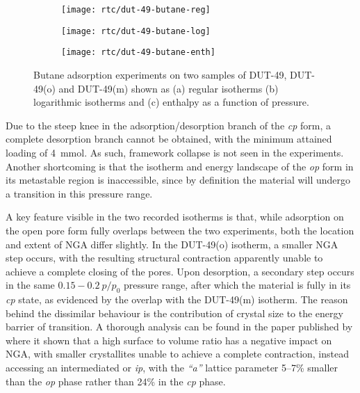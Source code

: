 \begin{figure}[htb]
    \centering
    \begin{subfigure}{0.33\linewidth}
        \texttt{[image: rtc/dut-49-butane-reg]}%
        \caption{}\label{dut:fig:dut-49-butane-reg}
    \end{subfigure}%
    \begin{subfigure}{0.33\linewidth}
        \texttt{[image: rtc/dut-49-butane-log]}%
        \caption{}\label{dut:fig:dut-49-butane-log}
    \end{subfigure}%
    \begin{subfigure}{0.33\linewidth}
        \texttt{[image: rtc/dut-49-butane-enth]}%
        \caption{}\label{dut:fig:dut-49-butane-enth}
    \end{subfigure}%
    \caption{Butane adsorption experiments on two samples of 
    DUT-49, DUT-49(o) and DUT-49(m) shown as (a) regular 
    isotherms (b) logarithmic isotherms 
    and (c) enthalpy as a function of pressure.}%
    \label{dut:fig:dut-49-butane}
\end{figure}

Due to the steep knee in the adsorption/desorption branch of the 
\textit{cp} form, a complete desorption branch cannot be obtained,
with the minimum attained loading of \SI{4}{\milli\mol}. As such,
framework collapse is not seen in the experiments. Another 
shortcoming is that the isotherm
and energy landscape of the \textit{op} form in its metastable 
region is inaccessible, since by definition the material will 
undergo a transition in this pressure range.

A key feature visible in the two recorded isotherms is that,
while adsorption on the open pore form fully overlaps between the 
two experiments, both the location and extent of \gls{NGA} differ 
slightly. In the DUT-49(o) isotherm, a smaller \gls{NGA} step occurs,
with the resulting structural contraction apparently unable to 
achieve a complete closing of the pores. Upon desorption, a 
secondary step occurs in the same \(0.15-0.2~p/p_0\) pressure range,
after which the material is fully in its \textit{cp} state,
as evidenced by the overlap with the DUT-49(m) isotherm. The 
reason behind the dissimilar behaviour is the contribution
of crystal size to the energy barrier of transition. A thorough
analysis can be found in the paper published 
by \citet{krauseEffectCrystalliteSize2018} where it shown that 
a high surface to volume ratio has a negative impact on \gls{NGA}, with 
smaller crystallites unable to achieve a complete contraction,
instead accessing an intermediated or \textit{ip}, with the \textit{``a''}
lattice parameter 5--7\% smaller than the \textit{op} phase
rather than 24\% in the \textit{cp} phase.

